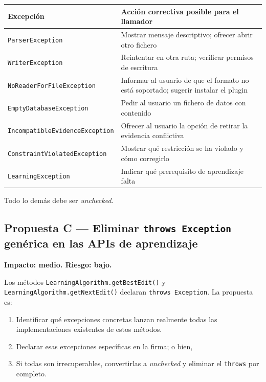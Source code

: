 \documentclass[11pt,a4paper]{article}
\begin{document}
\begin{longtable}{p{6.5cm}p{8.5cm}}
    \toprule
    \textbf{Excepción} & \textbf{Acción correctiva posible para el llamador} \\
    \midrule
    \texttt{ParserException}               & Mostrar mensaje descriptivo; ofrecer abrir otro fichero \\
    \texttt{WriterException}               & Reintentar en otra ruta; verificar permisos de escritura \\
    \texttt{NoReaderForFileException}      & Informar al usuario de que el formato no está soportado; sugerir instalar el plugin \\
    \texttt{EmptyDatabaseException}        & Pedir al usuario un fichero de datos con contenido \\
    \texttt{IncompatibleEvidenceException} & Ofrecer al usuario la opción de retirar la evidencia conflictiva \\
    \texttt{ConstraintViolatedException}   & Mostrar qué restricción se ha violado y cómo corregirlo \\
    \texttt{LearningException}             & Indicar qué prerequisito de aprendizaje falta \\
    \bottomrule
\end{longtable}

Todo lo demás debe ser \textit{unchecked}.

\subsection{Propuesta C — Eliminar \texttt{throws Exception} genérica en las APIs de aprendizaje}

\textbf{Impacto: medio. Riesgo: bajo.}

Los métodos \texttt{LearningAlgorithm.getBestEdit()} y \texttt{LearningAlgorithm.getNextEdit()}
declaran \texttt{throws Exception}. La propuesta es:

\begin{enumerate}
    \item Identificar qué excepciones concretas lanzan realmente todas las implementaciones
          existentes de estos métodos.
    \item Declarar esas excepciones específicas en la firma; o bien,
    \item Si todas son irrecuperables, convertirlas a \textit{unchecked} y eliminar el
          \texttt{throws} por completo.
\end{enumerate}
\end{document}
